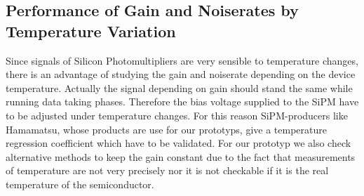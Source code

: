 \subsection{Performance of Gain and Noiserates by Temperature Variation}
\label{sipmGainNoise}
Since signals of Silicon Photomultipliers are very sensible to temperature changes, there is an advantage of studying the gain and noiserate depending on the device temperature. Actually the signal depending on gain should stand the same while running data taking phases. 
Therefore the bias voltage supplied to the SiPM have to be adjusted under temperature changes. For this reason SiPM-producers like Hamamatsu, whose products are use for our prototyps, give a temperature regression coefficient which have to be validated. For our prototyp we also check alternative methods to keep the gain constant due to the fact that measurements of temperature are not very precisely nor it is not checkable if it is the real temperature of the semiconductor.

